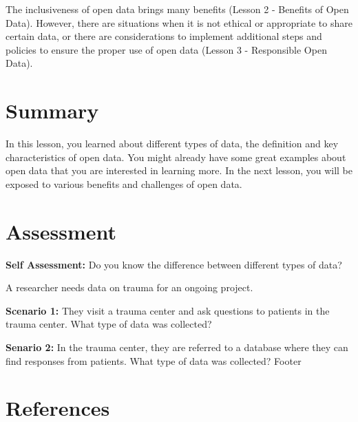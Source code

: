 \documentclass[
  letterpaper,
  DIV=11,
  numbers=noendperiod]{scrreport}
\begin{document}
The inclusiveness of open data brings many benefits (Lesson 2 - Benefits
of Open Data). However, there are situations when it is not ethical or
appropriate to share certain data, or there are considerations to
implement additional steps and policies to ensure the proper use of open
data (Lesson 3 - Responsible Open Data).

\hypertarget{summary-9}{%
\section*{Summary}\label{summary-9}}


In this lesson, you learned about different types of data, the
definition and key characteristics of open data. You might already have
some great examples about open data that you are interested in learning
more. In the next lesson, you will be exposed to various benefits and
challenges of open data.

\hypertarget{assessment}{%
\section*{Assessment}\label{assessment}}


\textbf{Self Assessment:} Do you know the difference between different
types of data?

A researcher needs data on trauma for an ongoing project.

\textbf{Scenario 1:} They visit a trauma center and ask questions to
patients in the trauma center. What type of data was collected?

\textbf{Senario 2:} In the trauma center, they are referred to a
database where they can find responses from patients. What type of data
was collected? Footer

\hypertarget{references-2}{%
\section*{References}\label{references-2}}

\end{document}
